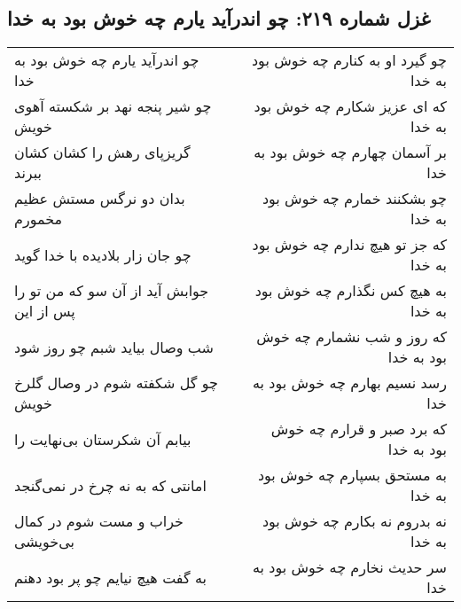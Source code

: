 \begin{center}
\section*{غزل شماره ۲۱۹: چو اندرآید یارم چه خوش بود به خدا}
\label{sec:0219}
\begin{longtable}{l p{0.5cm} r}
چو اندرآید یارم چه خوش بود به خدا
&&
چو گیرد او به کنارم چه خوش بود به خدا
\\
چو شیر پنجه نهد بر شکسته آهوی خویش
&&
که ای عزیز شکارم چه خوش بود به خدا
\\
گریزپای رهش را کشان کشان ببرند
&&
بر آسمان چهارم چه خوش بود به خدا
\\
بدان دو نرگس مستش عظیم مخمورم
&&
چو بشکنند خمارم چه خوش بود به خدا
\\
چو جان زار بلادیده با خدا گوید
&&
که جز تو هیچ ندارم چه خوش بود به خدا
\\
جوابش آید از آن سو که من تو را پس از این
&&
به هیچ کس نگذارم چه خوش بود به خدا
\\
شب وصال بیاید شبم چو روز شود
&&
که روز و شب نشمارم چه خوش بود به خدا
\\
چو گل شکفته شوم در وصال گلرخ خویش
&&
رسد نسیم بهارم چه خوش بود به خدا
\\
بیابم آن شکرستان بی‌نهایت را
&&
که برد صبر و قرارم چه خوش بود به خدا
\\
امانتی که به نه چرخ در نمی‌گنجد
&&
به مستحق بسپارم چه خوش بود به خدا
\\
خراب و مست شوم در کمال بی‌خویشی
&&
نه بدروم نه بکارم چه خوش بود به خدا
\\
به گفت هیچ نیایم چو پر بود دهنم
&&
سر حدیث نخارم چه خوش بود به خدا
\\
\end{longtable}
\end{center}
